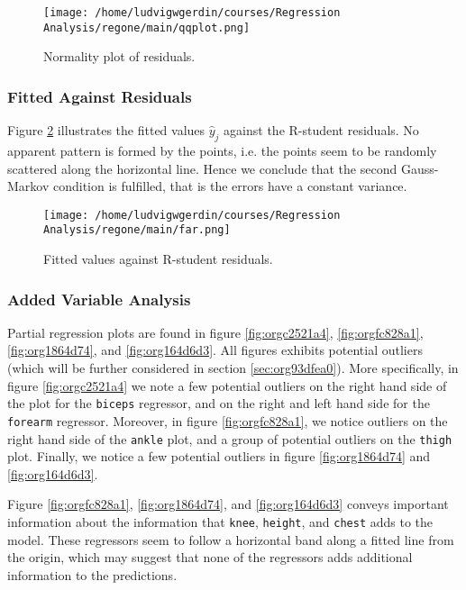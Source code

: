 \documentclass[11pt]{article}
\begin{document}
\begin{figure}[htbp]
\centering
\texttt{[image: /home/ludvigwgerdin/courses/Regression Analysis/regone/main/qqplot.png]}
\caption{\label{fig:org2270dd0}
Normality plot of residuals.}
\end{figure}

\subsubsection{Fitted Against Residuals}
\label{sec:org76ac2d8}

Figure \ref{fig:org9315735} illustrates the fitted values \(\hat y_j\) against the R-student residuals. No apparent 
pattern is formed by the points, i.e. the points seem to be randomly scattered along the horizontal line.
Hence we conclude that the second Gauss-Markov condition is fulfilled, that is the errors have a constant 
variance.

\begin{figure}[htbp]
\centering
\texttt{[image: /home/ludvigwgerdin/courses/Regression Analysis/regone/main/far.png]}
\caption{\label{fig:org9315735}
Fitted values against R-student residuals.}
\end{figure}

\subsubsection{Added Variable Analysis}
\label{sec:org0681a61}
Partial regression plots are found in figure \ref{fig:orgc2521a4}, \ref{fig:orgfc828a1},
\ref{fig:org1864d74}, and \ref{fig:org164d6d3}. All figures exhibits potential outliers 
(which will be further considered in section \ref{sec:org93dfea0}).
More specifically, in figure \ref{fig:orgc2521a4} we note a 
few potential outliers on the right hand side of the plot for the \texttt{biceps} regressor, and on the
right and left hand side for the \texttt{forearm} regressor. Moreover, in figure \ref{fig:orgfc828a1}, we 
notice outliers on the right hand side of the \texttt{ankle} plot, and a group of potential outliers on the
\texttt{thigh} plot. Finally, we notice a few potential outliers in figure \ref{fig:org1864d74} and 
\ref{fig:org164d6d3}.

Figure \ref{fig:orgfc828a1}, \ref{fig:org1864d74}, and \ref{fig:org164d6d3} 
conveys important information about the information that \texttt{knee}, \texttt{height}, and
\texttt{chest} adds to the model. These regressors seem to follow a horizontal band along a fitted 
line from the origin, which may suggest that none of the regressors adds additional information 
to the predictions.
\end{document}
